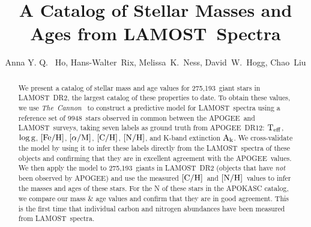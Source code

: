 \documentclass[12pt, preprint]{aastex}
\newcommand{\tc}{\textsl{The~Cannon}}
\newcommand{\apogee}{APOGEE}
\newcommand{\lamost}{LAMOST}
\newcommand{\teff}{\mbox{$\rm T_{eff}$}}
\newcommand{\logg}{\mbox{$\rm \log g$}}
\newcommand{\feh}{\mbox{$\rm [Fe/H]$}}
\newcommand{\alpham}{\mbox{$\rm [\alpha/M]$}}
\newcommand{\carbon}{\mbox{$\rm [C/H]$}}
\newcommand{\nitrogen}{\mbox{$\rm [N/H]$}}
\newcommand{\ak}{\mbox{$\rm A_k$}}
\newcommand{\ntrobj}{9948}
\newcommand{\ntestobj}{275,193}
\begin{document}
\title{A Catalog of Stellar Masses and Ages from \lamost\ Spectra}
\author{Anna Y. Q. ~Ho,
Hans-Walter~Rix,
Melissa~K.~Ness,
David~W.~Hogg, 
Chao~Liu
}


\begin{abstract}

We present a catalog of stellar mass and age values
for \ntestobj\ giant stars in \lamost\ DR2,
the largest catalog of these properties to date.
To obtain these values, we use \tc\ \citep{Ness2015}
to construct a predictive model for \lamost\ spectra 
using a reference set of \ntrobj\ stars observed in common 
between the \apogee\ and \lamost\ surveys,
taking seven labels as ground truth from \apogee\ DR12:
\teff, \logg, \feh, \alpham, \carbon, \nitrogen, 
and K-band extinction \ak.
We cross-validate the model by using it to infer these labels 
directly from the \lamost\ spectra of these objects
and confirming that they are in excellent agreement
with the \apogee\ values.
We then apply the model to \ntestobj\ giants
in \lamost\ DR2 (objects that have \emph{not} been observed by \apogee)
and use the measured \carbon\ and \nitrogen\ 
values to infer the masses and ages of these stars.
For the N of these stars in the APOKASC catalog,
we compare our mass \& age values and confirm that they
are in good agreement.
This is the first time that individual carbon and nitrogen
abundances have been measured from \lamost\ spectra.

\end{abstract}

\end{document}
